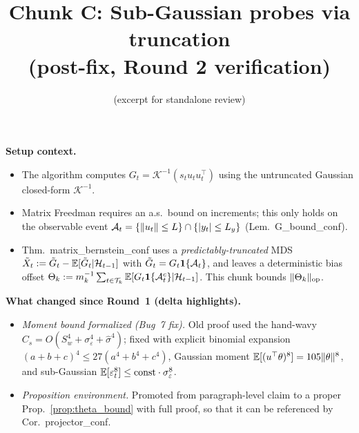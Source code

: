 

\title{Chunk C: Sub-Gaussian probes via truncation\\(post-fix, Round 2 verification)}
\author{(excerpt for standalone review)}
\date{}


\maketitle

\textbf{Setup context.}
\begin{itemize}[leftmargin=*,itemsep=1pt,topsep=1pt]
\item The algorithm computes $G_t=\mathcal K^{-1}(s_t u_tu_t^\top)$
using the untruncated Gaussian closed-form $\mathcal K^{-1}$.
\item Matrix Freedman requires an a.s.\ bound on increments; this only
holds on the observable event $\mathcal{A}_t = \{\|u_t\|\le L\} \cap \{|y_t|\le L_y\}$
(Lem.\ G\_bound\_conf).
\item Thm.\ matrix\_bernstein\_conf uses a \emph{predictably-truncated}
MDS $\tilde X_t := \tilde G_t - \mathbb E[\tilde G_t|\mathcal{H}_{t-1}]$ with
$\tilde G_t = G_t\mathbf 1\{\mathcal{A}_t\}$, and leaves a deterministic bias
offset $\Theta_k := m_k^{-1}\sum_{t\in\mathcal{T}_k}\mathbb{E}[G_t\mathbf 1\{\mathcal{A}_t^c\}|\mathcal{H}_{t-1}]$.
This chunk bounds $\|\Theta_k\|_{\mathrm{op}}$.
\end{itemize}

\textbf{What changed since Round~1 (delta highlights).}
\begin{itemize}[leftmargin=*,itemsep=1pt,topsep=1pt]
\item \emph{Moment bound formalized (Bug~7 fix).} Old proof used the
hand-wavy $C_s=O(S_w^4+\sigma_\varepsilon^4+\hat\sigma^4)$; fixed with
explicit binomial expansion $(a+b+c)^4\le 27(a^4+b^4+c^4)$, Gaussian
moment $\mathbb{E}[(u^\top\theta)^8]=105\|\theta\|^8$, and sub-Gaussian
$\mathbb{E}[\varepsilon_t^8]\le\text{const}\cdot\sigma_\varepsilon^8$.
\item \emph{Proposition environment.} Promoted from paragraph-level
claim to a proper Prop.~\ref{prop:theta_bound} with full proof, so
that it can be referenced by Cor.\ projector\_conf.
\end{itemize}

